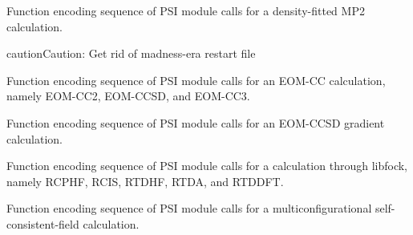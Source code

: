 \documentclass[letterpaper,10pt,english]{sphinxmanual}
\begin{document}
\begin{fulllineitems}
\label{index:proc.run_dfmp2}
Function encoding sequence of PSI module calls for
a density-fitted MP2 calculation.

\begin{notice}{caution}{Caution:}
Get rid of madness-era restart file
\end{notice}

\end{fulllineitems}


\begin{fulllineitems}
\label{index:proc.run_eom_cc}
Function encoding sequence of PSI module calls for
an EOM-CC calculation, namely EOM-CC2, EOM-CCSD, and EOM-CC3.

\end{fulllineitems}


\begin{fulllineitems}
\label{index:proc.run_eom_cc_gradient}
Function encoding sequence of PSI module calls for
an EOM-CCSD gradient calculation.

\end{fulllineitems}


\begin{fulllineitems}
\label{index:proc.run_libfock}
Function encoding sequence of PSI module calls for
a calculation through libfock, namely RCPHF,
RCIS, RTDHF, RTDA, and RTDDFT.

\end{fulllineitems}


\begin{fulllineitems}
\label{index:proc.run_mcscf}
Function encoding sequence of PSI module calls for
a multiconfigurational self-consistent-field calculation.

\end{fulllineitems}
\end{document}
